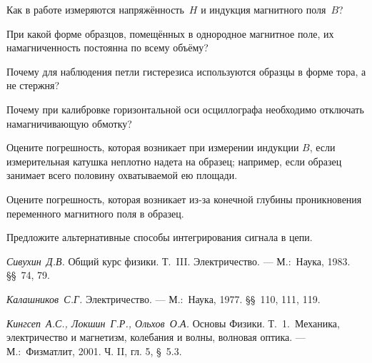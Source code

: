 \begin{lab:questions}

\item Как в работе измеряются напряжённость~$H$ и индукция магнитного поля~$B$?

\item
При какой форме образцов, помещённых в однородное магнитное поле, их
намагниченность постоянна по всему объёму?

\item
Почему для наблюдения петли гистерезиса используются образцы в форме тора,
а не стержня?

\item
Почему при калибровке горизонтальной оси осциллографа необходимо от­ключать
намагничивающую обмотку?

\item
Оцените погрешность, которая возникает при измерении индукции $B$, если
измерительная катушка неплотно надета на образец; например, если образец
занимает всего половину охватываемой ею площади.

\item
Оцените погрешность, которая возникает из-за конечной глубины проникновения
переменного магнитного поля в образец.

\item Предложите альтернативные способы интегрирования сигнала в цепи.

\end{lab:questions}
\begin{lab:literature}
\item
\emph{Сивухин~Д.В.} Общий курс физики. Т.~III. Электричество. --- М.:~Наука,
1983. \S\S~74, 79.

\item
\emph{Калашников~С.Г.} Электричество. --- М.:~Наука, 1977. \S\S~110, 111, 119.

\item
\emph{Кингсеп~А.С., Локшин~Г.Р., Ольхов~О.А.} Основы Физики. Т.~1.~Механика,
электричество и магнетизм, колебания и волны, волновая оптика. ---
М.:~Физматлит, 2001. Ч. II, гл. 5, \S~5.3.
\end{lab:literature}
